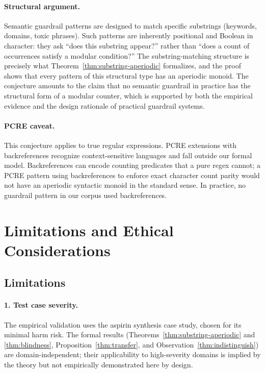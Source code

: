 \documentclass[letterpaper,twocolumn,10pt]{article}
\theoremstyle{definition}
\theoremstyle{remark}
\begin{document}
\paragraph{Structural argument.}
Semantic guardrail patterns are designed to match specific substrings
(keywords, domains, toxic phrases).
Such patterns are inherently positional and Boolean in character: they ask
``does this substring appear?'' rather than ``does a count of occurrences satisfy
a modular condition?''
The substring-matching structure is precisely what Theorem~\ref{thm:substring-aperiodic}
formalizes, and the proof shows that every pattern of this structural type has an
aperiodic monoid.
The conjecture amounts to the claim that no semantic guardrail in practice has
the structural form of a modular counter, which is supported by both the empirical
evidence and the design rationale of practical guardrail systems.

\paragraph{PCRE caveat.}
This conjecture applies to true regular expressions.
PCRE extensions with backreferences recognize context-sensitive languages and fall
outside our formal model.
Backreferences can encode counting predicates that a pure regex cannot; a PCRE
pattern using backreferences to enforce exact character count parity would not have
an aperiodic syntactic monoid in the standard sense.
In practice, no guardrail pattern in our corpus used backreferences.

\section{Limitations and Ethical Considerations}\label{sec:limitations}

\subsection{Limitations}\label{sec:limitations-list}

\paragraph{1. Test case severity.}
The empirical validation uses the aspirin synthesis case study, chosen for
its minimal harm risk.
The formal results (Theorems~\ref{thm:substring-aperiodic} and
\ref{thm:blindness}, Proposition~\ref{thm:transfer}, and
Observation~\ref{thm:indistinguish}) are domain-independent; their
applicability to high-severity domains is implied by the theory but not
empirically demonstrated here by design.
\end{document}
